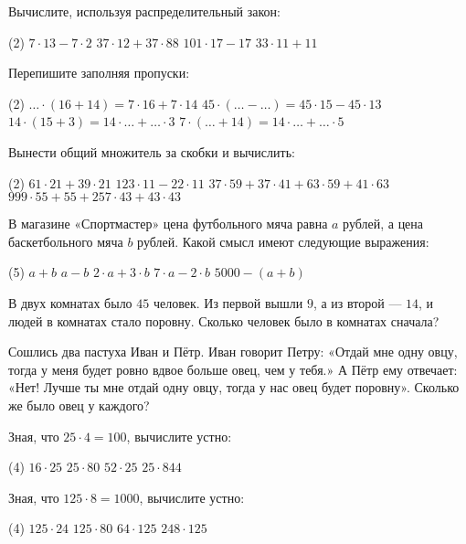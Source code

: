 \begin{class}[number=3]
	\begin{listofex}
	\item Вычислите, используя распределительный закон:
	\begin{tasks}(2)
		\task \( 7\cdot13-7\cdot2 \)
		\task \( 37\cdot12+37\cdot88 \)
		\task \( 101\cdot17-17 \)
		\task \( 33\cdot11+11 \)
	\end{tasks}
	\item Перепишите заполняя пропуски:
	\begin{tasks}(2)
		\task \( {\dots}\cdot(16+14)=7\cdot16+7\cdot14 \)
		\task \( 45\cdot({\dots}-{\dots})=45\cdot15-45\cdot13 \)
		\task \( 14\cdot(15+3)=14\cdot{\dots}+{\dots}\cdot3 \)
		\task \( 7\cdot({\dots}+14)=14\cdot{\dots}+{\dots}\cdot5 \)
	\end{tasks}
	\item Вынести общий множитель за скобки и вычислить:
	\begin{tasks}(2)
		\task \( 61\cdot21+39\cdot21 \)
		\task \( 123\cdot11-22\cdot11 \)
		\task \( 37\cdot59+37\cdot41+63\cdot59+41\cdot63 \)
		\task \( 999\cdot55+55+257\cdot43+43\cdot43 \)
	\end{tasks}
	\item В магазине «Спортмастер» цена футбольного мяча равна \( a \) рублей, а цена баскетбольного
	мяча \( b \) рублей. Какой смысл имеют следующие выражения:
	\begin{tasks}(5)
		\task \( a+b \)
		\task \( a-b \)
		\task \( 2\cdot a + 3\cdot b \)
		\task \( 7\cdot a - 2\cdot b \)
		\task \( 5000 - (a+b) \)
	\end{tasks}
	\item В двух комнатах было \( 45 \) человек. Из первой вышли \( 9 \), а из второй --- \( 14 \), и людей в комнатах стало поровну. Сколько человек было в комнатах сначала?
	\item Сошлись два пастуха Иван и Пётр. Иван говорит Петру: «Отдай мне одну овцу,
	тогда у меня будет ровно вдвое больше овец, чем у тебя.» А Пётр ему отвечает: «Нет!
	Лучше ты мне отдай одну овцу, тогда у нас овец будет поровну». Сколько же было овец у
	каждого?
	\item Зная, что \( 25\cdot4=100 \), вычислите устно:
	\begin{tasks}(4)
		\task \( 16\cdot25 \)
		\task \( 25\cdot80 \)
		\task \( 52\cdot25 \)
		\task \( 25\cdot844 \)
	\end{tasks}
	\item Зная, что \( 125\cdot8=1000 \), вычислите устно:
	\begin{tasks}(4)
		\task \( 125\cdot24 \)
		\task \( 125\cdot80 \)
		\task \( 64\cdot125 \)
		\task \( 248\cdot125 \)
	\end{tasks}
	\end{listofex}
\end{class}

